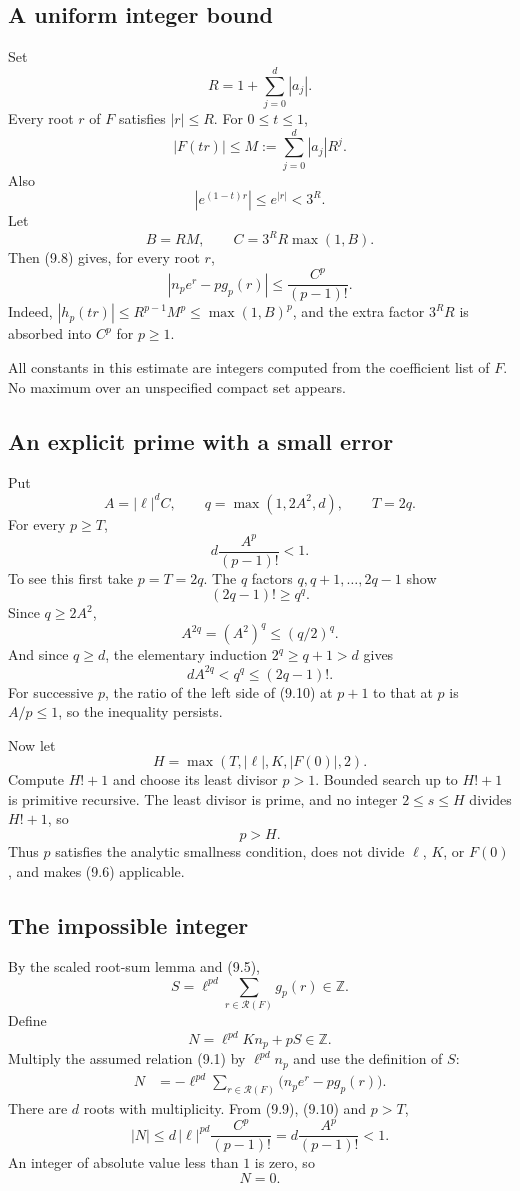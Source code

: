\documentclass[11pt]{article}
\newcommand{\Z}{\mathbb{Z}}
\begin{document}
\subsection{A uniform integer bound}

Set
\[
  R=1+\sum_{j=0}^{d}|a_j|.
\]
Every root $r$ of $F$ satisfies $|r|\le R$.  For $0\le t\le1$,
\[
  |F(tr)|\le M:=\sum_{j=0}^{d}|a_j|R^j.
\]
Also
\[
  |e^{(1-t)r}|\le e^{|r|}<3^R.
\]
Let
\[
  B=RM,
  \qquad C=3^R R\max(1,B).
\]
Then (9.8) gives, for every root $r$,
\[
  |n_p e^r-pg_p(r)|
  \le\frac{C^p}{(p-1)!}.                                  \tag{9.9}
\]
Indeed, $|h_p(tr)|\le R^{p-1}M^p\le\max(1,B)^p$, and the extra factor $3^R R$ is absorbed into $C^p$ for $p\ge1$.

All constants in this estimate are integers computed from the coefficient list of $F$.  No maximum over an unspecified compact set appears.

\subsection{An explicit prime with a small error}

Put
\[
  A=|\ell|^d C,
  \qquad q=\max(1,2A^2,d),
  \qquad T=2q.
\]
For every $p\ge T$,
\[
  d\frac{A^p}{(p-1)!}<1.                                  \tag{9.10}
\]
To see this first take $p=T=2q$.  The $q$ factors $q,q+1,\ldots,2q-1$ show
\[
  (2q-1)!\ge q^q.
\]
Since $q\ge2A^2$,
\[
  A^{2q}=(A^2)^q\le(q/2)^q.
\]
And since $q\ge d$, the elementary induction $2^q\ge q+1>d$ gives
\[
  dA^{2q}<q^q\le(2q-1)!.
\]
For successive $p$, the ratio of the left side of (9.10) at $p+1$ to that at $p$ is $A/p\le1$, so the inequality persists.

Now let
\[
  H=\max(T,|\ell|,K,|F(0)|,2).
\]
Compute $H!+1$ and choose its least divisor $p>1$.  Bounded search up to $H!+1$ is primitive recursive.  The least divisor is prime, and no integer $2\le s\le H$ divides $H!+1$, so
\[
  p>H.                                                     \tag{9.11}
\]
Thus $p$ satisfies the analytic smallness condition, does not divide $\ell$, $K$, or $F(0)$, and makes (9.6) applicable.

\subsection{The impossible integer}

By the scaled root-sum lemma and (9.5),
\[
  S=\ell^{pd}\sum_{r\in\mathcal R(F)}g_p(r)\in\Z.
\]
Define
\[
  N=\ell^{pd}K n_p+pS\in\Z.                               \tag{9.12}
\]
Multiply the assumed relation (9.1) by $\ell^{pd}n_p$ and use the definition of $S$:
\[
\begin{aligned}
  N
  &= -\ell^{pd}\sum_{r\in\mathcal R(F)}
       \bigl(n_p e^r-pg_p(r)\bigr).
\end{aligned}
\]
There are $d$ roots with multiplicity.  From (9.9), (9.10) and $p>T$,
\[
  |N|
  \le d\,|\ell|^{pd}\frac{C^p}{(p-1)!}
  =d\frac{A^p}{(p-1)!}<1.
\]
An integer of absolute value less than $1$ is zero, so
\[
  N=0.                                                     \tag{9.13}
\]
\end{document}
